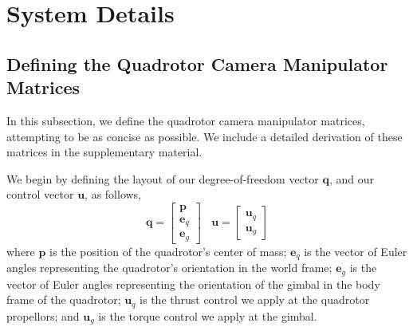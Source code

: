 

\section{System Details}

\subsection{Defining the Quadrotor Camera Manipulator Matrices}
\label{sec:ch2:manipulator}

In this subsection, we define the quadrotor camera manipulator matrices, attempting to be as concise as possible.
We include a detailed derivation of these matrices in the supplementary material.

We begin by defining the layout of our degree-of-freedom vector $\mathbf{q}$, and our control vector $\mathbf{u}$, as follows,
%
\begin{equation}
\mathbf{q} = 
\begin{bmatrix}
\mathbf{p} \\
\mathbf{e}_q \\
\mathbf{e}_g
\end{bmatrix}
%
~~~~
\mathbf{u} = 
\begin{bmatrix}
\mathbf{u}_q \\
\mathbf{u}_g
\end{bmatrix}
\end{equation}
%
where $\mathbf{p}$ is the position of the quadrotor's center of mass; $\mathbf{e}_q$ is the vector of Euler angles representing the quadrotor's orientation in the world frame; $\mathbf{e}_g$ is the vector of Euler angles representing the orientation of the gimbal in the body frame of the quadrotor; $\mathbf{u}_q$ is the thrust control we apply at the quadrotor propellors; and $\mathbf{u}_g$ is the torque control we apply at the gimbal.

